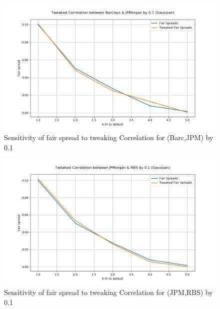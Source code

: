 \documentclass{report}
\theoremstyle{plain}
\theoremstyle{definition}
\begin{document}
\begin{figure}[H]
	\begin{center}
		\includegraphics[width=15cm]{Tweaked_Correlation_between_Barclays_&_JPMorgan_by_0,1_(Gaussian).png}
		\caption{Sensitivity of fair spread to tweaking Correlation for (Barc,JPM) by 0.1} 
		\label{Tweaked_Correlation_between_Barclays_&_JPMorgan_by_0.1_(Gaussian)}
	\end{center}
\end{figure}

\begin{figure}[H]
	\begin{center}
		\includegraphics[width=15cm]{Tweaked_Correlation_between_JPMorgan_&_RBS_by_0,1_(Gaussian).png}
		\caption{Sensitivity of fair spread to tweaking Correlation for (JPM,RBS) by 0.1} 
		\label{Tweaked_Correlation_between_JPMorgan_&_RBS_by_0.1_(Gaussian)}
	\end{center}
\end{figure}
\end{document}
